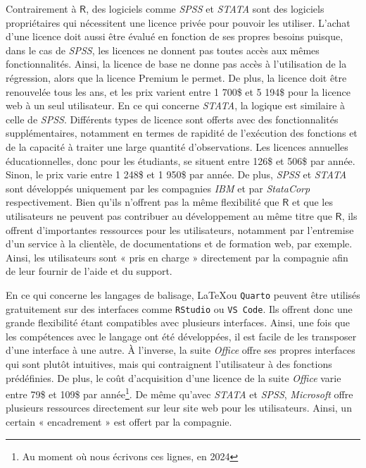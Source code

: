 \documentclass[
  letterpaper,
  DIV=11,
  numbers=noendperiod,
  oneside]{scrreprt}
\begin{document}
Contrairement à \(\textsf{R}\), des logiciels comme \emph{SPSS} et
\emph{STATA} sont des logiciels propriétaires qui nécessitent une
licence privée pour pouvoir les utiliser. L'achat d'une licence doit
aussi être évalué en fonction de ses propres besoins puisque, dans le
cas de \emph{SPSS}, les licences ne donnent pas toutes accès aux mêmes
fonctionnalités. Ainsi, la licence de base ne donne pas accès à
l'utilisation de la régression, alors que la licence Premium le permet.
De plus, la licence doit être renouvelée tous les ans, et les prix
varient entre 1 700\$ et 5 194\$ pour la licence web à un seul
utilisateur. En ce qui concerne \emph{STATA}, la logique est similaire à
celle de \emph{SPSS}. Différents types de licence sont offerts avec des
fonctionnalités supplémentaires, notamment en termes de rapidité de
l'exécution des fonctions et de la capacité à traiter une large quantité
d'observations. Les licences annuelles éducationnelles, donc pour les
étudiants, se situent entre 126\$ et 506\$ par année. Sinon, le prix
varie entre 1 248\$ et 1 950\$ par année. De plus, \emph{SPSS} et
\emph{STATA} sont développés uniquement par les compagnies \emph{IBM} et
par \emph{StataCorp} respectivement. Bien qu'ils n'offrent pas la même
flexibilité que \(\textsf{R}\) et que les utilisateurs ne peuvent pas
contribuer au développement au même titre que \(\textsf{R}\), ils
offrent d'importantes ressources pour les utilisateurs, notamment par
l'entremise d'un service à la clientèle, de documentations et de
formation web, par exemple. Ainsi, les utilisateurs sont « pris en
charge » directement par la compagnie afin de leur fournir de l'aide et
du support.

En ce qui concerne les langages de balisage, \LaTeX ou \texttt{Quarto}
peuvent être utilisés gratuitement sur des interfaces comme
\texttt{RStudio} ou \texttt{VS\ Code}. Ils offrent donc une grande
flexibilité étant compatibles avec plusieurs interfaces. Ainsi, une fois
que les compétences avec le langage ont été développées, il est facile
de les transposer d'une interface à une autre. À l'inverse, la suite
\emph{Office} offre ses propres interfaces qui sont plutôt intuitives,
mais qui contraignent l'utilisateur à des fonctions prédéfinies. De
plus, le coût d'acquisition d'une licence de la suite \emph{Office}
varie entre 79\$ et 109\$ par année\footnote{Au moment où nous écrivons
  ces lignes, en 2024}. De même qu'avec \emph{STATA} et \emph{SPSS},
\emph{Microsoft} offre plusieurs ressources directement sur leur site
web pour les utilisateurs. Ainsi, un certain « encadrement » est offert
par la compagnie.
\end{document}
